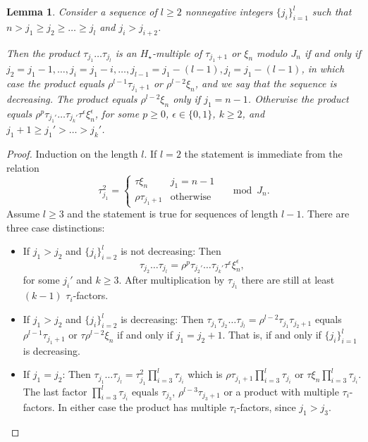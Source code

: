 \documentclass[11pt,hyp]{nyjm}
\theoremstyle{theoremstyle}
\newtheorem{lemma}[theorem]{Lemma}
\theoremstyle{definition}
\theoremstyle{theoremstyle}
\begin{document}
\begin{lemma}
  \label{induction2}
  Consider a sequence of $l \geq 2$ nonnegative integers $\{j_i\}_{i=1}^{l}$ such that $n > j_1 \geq j_2 \geq \dots \geq j_l$ and $j_i > j_{i+2}$.
  
  Then the product $\tau_{j_1}\dots \tau_{j_l}$ is an $H_\star$-multiple of $\tau_{j_1+1}$ or $\xi_n$ modulo $J_n$ if and only if
  $j_2 = j_1 - 1, \dots, j_{i} = j_1 - i, \dots, j_{l-1} = j_1 - (l-1), j_{l} = j_1-(l-1)$,
  in which case the product equals $\rho^{l-1} \tau_{j_1 + 1}$ or $\rho^{l-2}\xi_{n}$, and we say that the sequence is decreasing.
  The product equals $\rho^{l-2}\xi_{n}$ only if $j_1 = n-1$.
  Otherwise the product equals $\rho^p\tau_{j_1'}\dots\tau_{j_k'}\tau^\epsilon\xi_{n}^{\epsilon}$,
  for some $p \geq 0 $, $\epsilon \in \{0, 1\}$, $k \geq 2$, and $j_1+1 \geq j_1' > \dots > j_k'$.
\end{lemma}
\begin{proof}
  Induction on the length $l$.
  If $l = 2$ the statement is immediate from the relation
  \[
  \tau_{j_1}^2 = \begin{cases}
    \tau \xi_{n} & j_1 = n-1 \\
    \rho \tau_{j_1+1} & \text{otherwise}
  \end{cases}
  \quad\bmod J_n.
  \]
  Assume $l \geq 3$ and the statement is true for sequences of length $l-1$.
  There are three case distinctions:
  \begin{itemize}
  \item If $j_1 > j_2$ and $\{j_i\}_{i=2}^{l}$ is not decreasing:
    Then \[\tau_{j_2} \dots \tau_{j_l} = \rho^p\tau_{j_2'}\dots\tau_{j_k'}\tau^\epsilon\xi_{n}^{\epsilon},\] for some $j_i'$ and $k \geq 3$.
    After multiplication by $\tau_{j_1}$ there are still at least $(k-1)$ $\tau_i$-factors.
  \item If $j_1 > j_2$ and $\{j_i\}_{i=2}^{l}$ is decreasing:
    Then $\tau_{j_1}\tau_{j_2} \dots \tau_{j_l} = \rho^{l-2}\tau_{j_1}\tau_{j_2+1}$ equals $\rho^{l-1}\tau_{j_1 + 1}$
    or $\tau\rho^{l-2}\xi_{n}$
    if and only if $j_1 = j_2 + 1$.
    That is, if and only if $\{j_i\}_{i=1}^{l}$ is decreasing.
  \item If $j_1 = j_2$:
    Then $\tau_{j_1} \dots \tau_{j_l} = \tau_{j_1}^2 \prod_{i=3}^l \tau_{j_i}$
    which is $\rho \tau_{j_1+1}\prod_{i=3}^l \tau_{j_i}$ or $\tau \xi_{n}\prod_{i=3}^l \tau_{j_i}$.
    The last factor $\prod_{i=3}^l \tau_{j_i}$ equals $\tau_{j_3}$, $\rho^{l-3}\tau_{j_3+1}$
    or a product with multiple $\tau_i$-factors.
    In either case the product has multiple $\tau_i$-factors, since $j_1 > j_3$.
  \end{itemize}
\end{proof}
\end{document}
